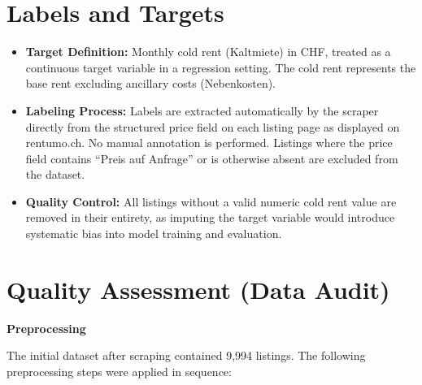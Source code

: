 \documentclass[11pt, a4paper]{article}
\begin{document}
\section{Labels and Targets}
\begin{itemize}
    \item \textbf{Target Definition:} Monthly cold rent (Kaltmiete) in CHF, treated as a continuous target variable in a regression setting. The cold rent represents the base rent excluding ancillary costs (Nebenkosten).
    \item \textbf{Labeling Process:} Labels are extracted automatically by the scraper directly from the structured price field on each listing page as displayed on rentumo.ch. No manual annotation is performed. Listings where the price field contains ``Preis auf Anfrage'' or is otherwise absent are excluded from the dataset.
    \item \textbf{Quality Control:} All listings without a valid numeric cold rent value are removed in their entirety, as imputing the target variable would introduce systematic bias into model training and evaluation.
\end{itemize}

\section{Quality Assessment (Data Audit)}

\textbf{Preprocessing}

\vspace{0.3em}
The initial dataset after scraping contained 9{,}994 listings. The following preprocessing steps were applied in sequence:
\end{document}

